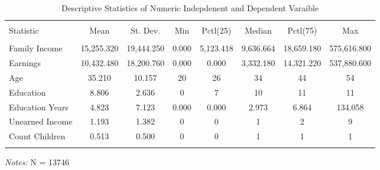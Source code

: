 \documentclass[a4paper]{article}
\begin{document}
\begin{table}[!htbp] 
\begin{adjustwidth}{-0cm}{-0cm}
\begin{threeparttable}
\small
\captionsetup{font=small, justification=raggedright,singlelinecheck=false}
  \caption{Descriptive Statistics of Numeric Indepdenent and Dependent Varaible} 
  \label{} 
\begin{tabular}{@{\extracolsep{5pt}}lccccccc} 
\\[-1.8ex]\hline 
\hline \\[-1.8ex] 
Statistic & \multicolumn{1}{c}{Mean} & \multicolumn{1}{c}{St. Dev.} & \multicolumn{1}{c}{Min} & \multicolumn{1}{c}{Pctl(25)} & \multicolumn{1}{c}{Median} & \multicolumn{1}{c}{Pctl(75)} & \multicolumn{1}{c}{Max} \\ 
\hline \\[-1.8ex] 
Family Income & 15,255.320 & 19,444.250 & 0.000 & 5,123.418 & 9,636.664 & 18,659.180 & 575,616.800 \\ 
Earnings & 10,432.480 & 18,200.760 & 0.000 & 0.000 & 3,332.180 & 14,321.220 & 537,880.600 \\ 
Age & 35.210 & 10.157 & 20 & 26 & 34 & 44 & 54 \\ 
Education & 8.806 & 2.636 & 0 & 7 & 10 & 11 & 11 \\ 
Education Years & 4.823 & 7.123 & 0.000 & 0.000 & 2.973 & 6.864 & 134.058 \\ 
Unearned Income & 1.193 & 1.382 & 0 & 0 & 1 & 2 & 9 \\ 
Count Children & 0.513 & 0.500 & 0 & 0 & 1 & 1 & 1 \\ 
\hline \\[-1.8ex] 
\end{tabular} 
\begin{tablenotes}
      \small
      \item\textit{Notes:} N = 13746
    \end{tablenotes}
\end{threeparttable}
\end{adjustwidth}
\end{table}
\end{document}
